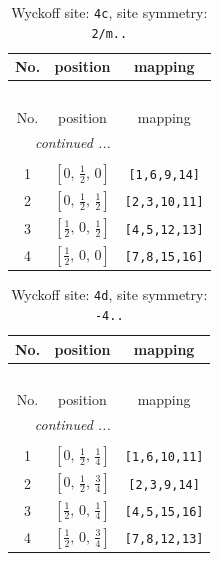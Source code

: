 \documentclass[fleqn,8pt]{jsarticle}
\begin{document}
\renewcommand{\arraystretch}{1.2}
\begin{longtable}{ccc}
\caption{Wyckoff site: {\tt 4c}, site symmetry: {\tt 2/m..}}
 \\
 \hline \hline
No. & position & mapping \\ \hline \endfirsthead

\multicolumn{2}{l}{\tablename\ \thetable{}} \\
 \hline \hline
No. & position & mapping \\ \hline \endhead

 \hline \hline
\multicolumn{2}{r}{\footnotesize\it continued ...} \\ \endfoot

 \hline \hline
\multicolumn{2}{r}{} \\ \endlastfoot

1 & $\left[ 0,\, \frac{1}{2},\, 0 \right]$ & {\tt [1,6,9,14]} \\ \hline
2 & $\left[ 0,\, \frac{1}{2},\, \frac{1}{2} \right]$ & {\tt [2,3,10,11]} \\ \hline
3 & $\left[ \frac{1}{2},\, 0,\, \frac{1}{2} \right]$ & {\tt [4,5,12,13]} \\ \hline
4 & $\left[ \frac{1}{2},\, 0,\, 0 \right]$ & {\tt [7,8,15,16]} \\
\end{longtable}
\renewcommand{\arraystretch}{1.2}
\begin{longtable}{ccc}
\caption{Wyckoff site: {\tt 4d}, site symmetry: {\tt -4..}}
 \\
 \hline \hline
No. & position & mapping \\ \hline \endfirsthead

\multicolumn{2}{l}{\tablename\ \thetable{}} \\
 \hline \hline
No. & position & mapping \\ \hline \endhead

 \hline \hline
\multicolumn{2}{r}{\footnotesize\it continued ...} \\ \endfoot

 \hline \hline
\multicolumn{2}{r}{} \\ \endlastfoot

1 & $\left[ 0,\, \frac{1}{2},\, \frac{1}{4} \right]$ & {\tt [1,6,10,11]} \\ \hline
2 & $\left[ 0,\, \frac{1}{2},\, \frac{3}{4} \right]$ & {\tt [2,3,9,14]} \\ \hline
3 & $\left[ \frac{1}{2},\, 0,\, \frac{1}{4} \right]$ & {\tt [4,5,15,16]} \\ \hline
4 & $\left[ \frac{1}{2},\, 0,\, \frac{3}{4} \right]$ & {\tt [7,8,12,13]} \\
\end{longtable}
\end{document}
